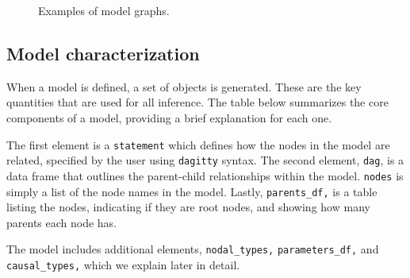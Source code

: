 \documentclass[
  11pt,
  article]{jss}
\begin{document}
\begin{figure}

\begin{minipage}[t]{0.50\linewidth}

{\centering 


}

\end{minipage}%
%
\begin{minipage}[t]{0.50\linewidth}

{\centering 


}

\end{minipage}%

\caption{\label{fig-plots}Examples of model graphs.}

\end{figure}

\hypertarget{model-characterization}{%
\subsection{Model characterization}\label{model-characterization}}

When a model is defined, a set of objects is generated. These are the
key quantities that are used for all inference. The table below
summarizes the core components of a model, providing a brief explanation
for each one.

The first element is a \texttt{statement} which defines how the nodes in
the model are related, specified by the user using \texttt{dagitty}
syntax. The second element, \texttt{dag}, is a data frame that outlines
the parent-child relationships within the model. \texttt{nodes} is
simply a list of the node names in the model. Lastly,
\texttt{parents\_df,} is a table listing the nodes, indicating if they
are root nodes, and showing how many parents each node has.

The model includes additional elements, \texttt{nodal\_types,}
\texttt{parameters\_df,} and \texttt{causal\_types,} which we explain
later in detail.
\end{document}
